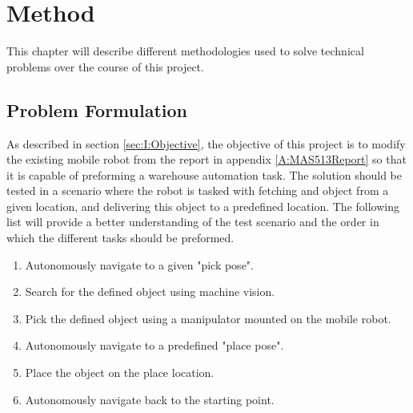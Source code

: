 \chapter{Method}

This chapter will describe different methodologies used to solve technical problems over the course of this project.

\section{Problem Formulation} \label{sec:M:ProblemFormulation}
As described in section \ref{sec:I:Objective}, the objective of this project is to modify the existing mobile robot from the report in appendix \ref{A:MAS513Report} so that it is capable of preforming a warehouse automation task. The solution should be tested in a scenario where the robot is tasked with fetching and object from a given location, and delivering this object to a predefined location. The following list will provide a better understanding of the test scenario and the order in which the different tasks should be preformed.

\begin{enumerate}
    \item Autonomously navigate to a given "pick pose".
    \item Search for the defined object using machine vision.
    \item Pick the defined object using a manipulator mounted on the mobile robot.
    \item Autonomously navigate to a predefined "place pose".
    \item Place the object on the place location.
    \item Autonomously navigate back to the starting point.
\end{enumerate}





